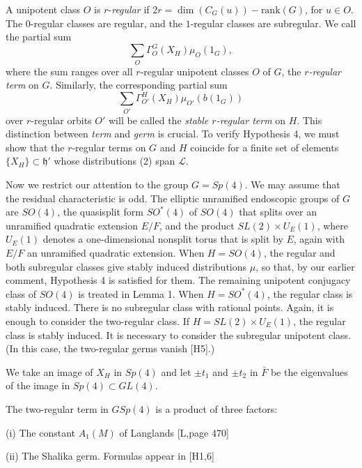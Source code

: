 \documentclass{amsart}
\newcommand\cL{{\mathcal L}}
\newcommand\h{{\mathfrak h}}
\begin{document}
A unipotent class $O$ is $r$-{\it regular} if $2r=\dim(C_G(u))-
\text{rank}(G)$, for $u\in O$.  The $0$-regular classes are 
regular, and the $1$-regular classes are subregular.
We call the partial sum 
$$\sum_O\Gamma_O^G(X_H)\mu_O(1_G),$$ where the sum ranges
over all $r$-regular unipotent classes $O$ of $G$, the
{\it $r$-regular term\/} on $G$.  Similarly, the corresponding partial
sum
$$\sum_{O'}\Gamma_{O'}^H(X_H)\mu_{O'}(b(1_G))$$
over $r$-regular orbits $O'$ will be called the
{\it stable $r$-regular term\/} on $H$.  This
distinction between {\it term\/} and {\it germ\/} is
crucial. To verify Hypothesis
4, we must show that the $r$-regular terms on $G$ and $H$
coincide for a finite set of elements $\{X_H\}\subset \h'$ whose
distributions (2) span $\cL$.

\bigskip

Now we restrict our attention to the group $G=Sp(4)$.  We may assume
that the residual characteristic is odd.  The elliptic unramified
endoscopic groups of $G$ are $SO(4)$, the quasisplit form $SO^*(4)$ of
$SO(4)$ that splits over an unramified quadratic extension $E/F$, and
the product $SL(2)\times U_E(1)$, where $U_E(1)$ denotes a
one-dimensional nonsplit torus that is split by $E$, again with $E/F$
an unramified quadratic extension.  When $H=SO(4)$, the regular and
both subregular classes give stably induced distributions $\mu$, so
that, by our earlier comment, Hypothesis 4 is satisfied for them.  The
remaining unipotent conjugacy class of $SO(4)$ is treated in Lemma 1.
When $H=SO^*(4)$, the regular class is stably induced. There is no
subregular class with rational points. Again, it is enough to consider
the two-regular class.  If $H=SL(2)\times U_E(1)$, the regular class
is stably induced. It is necessary to consider the subregular
unipotent class.  (In this case, the two-regular germs vanish [H5].)

We take an image of $X_H$ in $Sp(4)$ and let $\pm t_1$ and $\pm t_2$
in $\bar F$ be the eigenvalues of the image in $Sp(4)\subset GL(4)$.

The two-regular term in $GSp(4)$ is a product of three factors:

(i)  The constant $A_1(M)$ of Langlands [L,page 470]

(ii)  The Shalika germ. Formulas appear in [H1,6]
\end{document}
